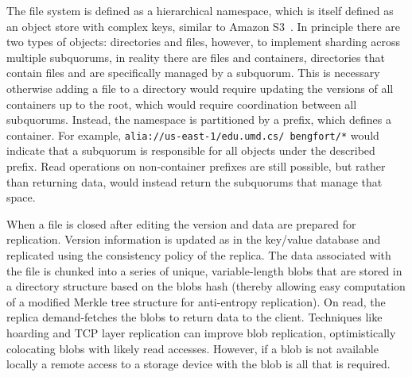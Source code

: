 The file system is defined as a hierarchical namespace, which is itself defined as an object store with complex keys, similar to Amazon S3~\cite{bermbach_eventual_2011}.
In principle there are two types of objects: directories and files, however, to implement sharding across multiple subquorums, in reality there are files and containers, directories that contain files and are specifically managed by a subquorum.
This is necessary otherwise adding a file to a directory would require updating the versions of all containers up to the root, which would require coordination between all subquorums.
Instead, the namespace is partitioned by a prefix, which defines a container. For example, \texttt{alia://us-east-1/edu.umd.cs/~bengfort/*} would indicate that a subquorum is responsible for all objects under the described prefix.
Read operations on non-container prefixes are still possible, but rather than returning data, would instead return the subquorums that manage that space.

When a file is closed after editing the version and data are prepared for replication.
Version information is updated as in the key/value database and replicated using the consistency policy of the replica.
The data associated with the file is chunked into a series of unique, variable-length blobs that are stored in a directory structure based on the blobs hash (thereby allowing easy computation of a modified Merkle tree structure for anti-entropy replication).
On read, the replica demand-fetches the blobs to return data to the client.
Techniques like hoarding \cite{kuenning_automated_1997} and TCP layer replication \cite{venkataramani_operating_2002} can improve blob replication, optimistically colocating blobs with likely read accesses. However, if a blob is not available locally a remote access to a storage device with the blob is all that is required.

